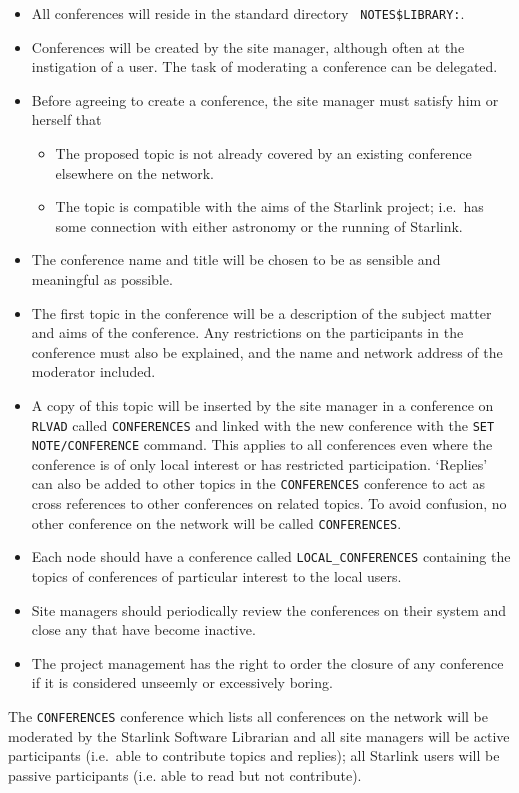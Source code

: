\begin{itemize}

\item All conferences will reside in the standard directory {\tt
NOTES\$LIBRARY:}.

\item Conferences will be created by the site manager, although often at
the instigation of a user. The task of moderating a conference can be
delegated.

\item Before agreeing to create a conference, the site manager must
satisfy him or herself that
\begin{itemize}
\item The proposed topic is not already covered by an existing conference
elsewhere on the network.
\item The topic is compatible with the aims of the Starlink project; i.e.\
has some connection with either astronomy or the running of Starlink.
\end{itemize}

\item The conference name and title  will be chosen to be as sensible and
meaningful as possible. 

\item The first topic in the conference will be a description of the
subject matter and aims of the conference. Any restrictions on the
participants in the conference must also be explained, and the name and
network address of the moderator included.

\item A copy of this topic will be inserted by the site manager in a
conference on {\tt RLVAD} called {\tt CONFERENCES} and linked with the new
conference with the {\tt SET NOTE/CONFERENCE} command. This applies to all
conferences even where the conference is of only local interest or has
restricted participation.  `Replies' can also be added to other topics in the
{\tt CONFERENCES} conference to act as cross references to other conferences on
related topics. To avoid confusion, no other conference on the network will be
called {\tt CONFERENCES}. 

\item Each node should have a conference called {\tt LOCAL\_CONFERENCES}
containing the topics of conferences of particular interest to the local
users.         

\item Site managers should periodically review the conferences on their
system and close any that have become inactive.

\item The project management has the right to order the closure of any
conference if it is considered unseemly or excessively boring. 

\end{itemize}

The {\tt CONFERENCES} conference which lists all conferences on the network
will be moderated by the Starlink Software Librarian and all site managers will
be active participants (i.e.\ able to contribute topics and replies); all
Starlink users will be passive participants (i.e. able to read but not
contribute). 


